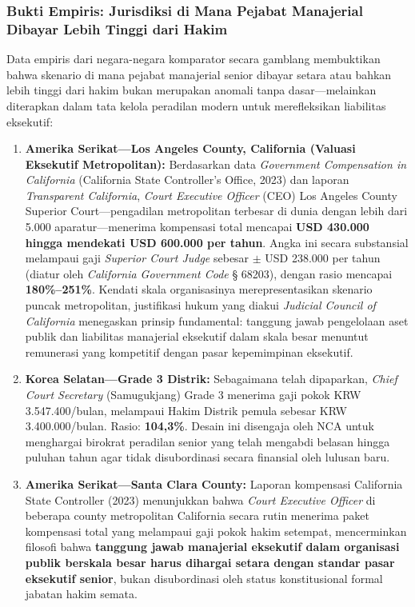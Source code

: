 \documentclass[12pt, a4paper]{article}
\begin{document}
\begin{table}[H]
\begin{tabular}{p{3.0cm} p{4.3cm} p{4.3cm} p{2.5cm}}
\hline
\end{tabular}
\end{table}

\subsubsection{Bukti Empiris: Jurisdiksi di Mana Pejabat Manajerial Dibayar Lebih Tinggi dari Hakim}

Data empiris dari negara-negara komparator secara gamblang membuktikan bahwa skenario di mana pejabat manajerial senior dibayar setara atau bahkan lebih tinggi dari hakim bukan merupakan anomali tanpa dasar---melainkan diterapkan dalam tata kelola peradilan modern untuk merefleksikan liabilitas eksekutif:

\begin{enumerate}
    \item \textbf{Amerika Serikat---Los Angeles County, California (Valuasi Eksekutif Metropolitan):} Berdasarkan data \textit{Government Compensation in California} (California State Controller's Office, 2023) dan laporan \textit{Transparent California}, \textit{Court Executive Officer} (CEO) Los Angeles County Superior Court---pengadilan metropolitan terbesar di dunia dengan lebih dari 5.000 aparatur---menerima kompensasi total mencapai \textbf{USD 430.000 hingga mendekati USD 600.000 per tahun}. Angka ini secara substansial melampaui gaji \textit{Superior Court Judge} sebesar $\pm$ USD 238.000 per tahun (diatur oleh \textit{California Government Code} § 68203), dengan rasio mencapai \textbf{180\%--251\%}. Kendati skala organisasinya merepresentasikan skenario puncak metropolitan, justifikasi hukum yang diakui \textit{Judicial Council of California} menegaskan prinsip fundamental: tanggung jawab pengelolaan aset publik dan liabilitas manajerial eksekutif dalam skala besar menuntut remunerasi yang kompetitif dengan pasar kepemimpinan eksekutif.
    \item \textbf{Korea Selatan---Grade 3 Distrik:} Sebagaimana telah dipaparkan, \textit{Chief Court Secretary} (Samugukjang) Grade 3 menerima gaji pokok KRW 3.547.400/bulan, melampaui Hakim Distrik pemula sebesar KRW 3.400.000/bulan. Rasio: \textbf{104,3\%}. Desain ini disengaja oleh NCA untuk menghargai birokrat peradilan senior yang telah mengabdi belasan hingga puluhan tahun agar tidak disubordinasi secara finansial oleh lulusan baru.
    \item \textbf{Amerika Serikat---Santa Clara County:} Laporan kompensasi California State Controller (2023) menunjukkan bahwa \textit{Court Executive Officer} di beberapa county metropolitan California secara rutin menerima paket kompensasi total yang melampaui gaji pokok hakim setempat, mencerminkan filosofi bahwa \textbf{tanggung jawab manajerial eksekutif dalam organisasi publik berskala besar harus dihargai setara dengan standar pasar eksekutif senior}, bukan disubordinasi oleh status konstitusional formal jabatan hakim semata.
\end{enumerate}
\end{document}
